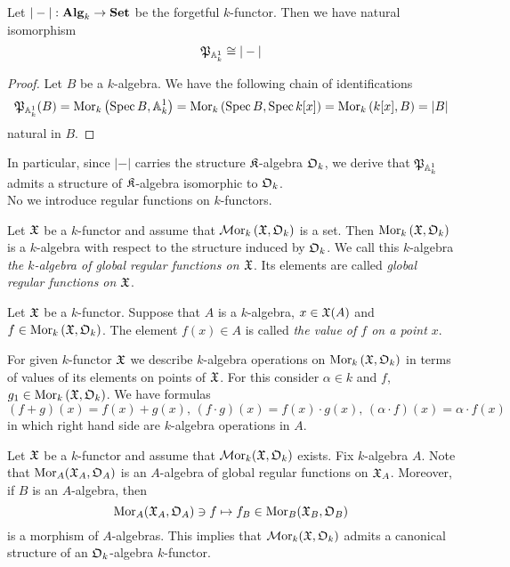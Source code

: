 \begin{fact}\label{fact:affineline_as_forgetfulfunctor}
Let $|-|:\mathbf{Alg}_k\rightarrow \mathbf{Set}$ be the forgetful $k$-functor. Then we have natural isomorphism
$${\mathfrak P}_{\mathbb{A}^1_k} \cong |-|$$
\end{fact}
\begin{proof}
Let $B$ be a $k$-algebra. We have the following chain of identifications
$${\mathfrak P}_{\mathbb{A}^1_k}(B) = \mathrm{Mor}_k\left(\mathrm{Spec}\, B, \mathbb{A}^1_k\right) = \mathrm{Mor}_k\left(\mathrm{Spec}\, B, \mathrm{Spec}\, k[x]\right) = \mathrm{Mor}_k\left(k[x], B\right) = |B|$$
natural in $B$.
\end{proof}
\noindent
In particular, since $|-|$ carries the structure ${\mathfrak K}$-algebra ${\mathfrak O}_k$, we derive that ${\mathfrak P}_{\mathbb{A}^1_k}$ admits a structure of ${\mathfrak K}$-algebra isomorphic to ${\mathfrak O}_k$.\\
No we introduce regular functions on $k$-functors.

\begin{definition}
Let ${\mathfrak X}$ be a $k$-functor and assume that $\mathcal{M}\mathrm{or}_k\left({\mathfrak X}, {\mathfrak O}_k\right)$ is a set. Then $\mathrm{Mor}_k\left({\mathfrak X}, {\mathfrak O}_k\right)$ is a $k$-algebra with respect to the structure induced by ${\mathfrak O}_k$. We call this $k$-algebra \textit{the $k$-algebra of global regular functions on ${\mathfrak X}$}. Its elements are called \textit{global regular functions on ${\mathfrak X}$}.
\end{definition}

\begin{definition}
Let ${\mathfrak X}$ be a $k$-functor. Suppose that $A$ is a $k$-algebra, $x\in {\mathfrak X}(A)$ and $f\in \mathrm{Mor}_k\left({\mathfrak X},{\mathfrak O}_k\right)$. The element $f(x) \in A$ is called \textit{the value of $f$ on a point $x$}.
\end{definition}
\noindent
For given $k$-functor ${\mathfrak X}$ we describe $k$-algebra operations on $\mathrm{Mor}_k\left({\mathfrak X},{\mathfrak O}_k\right)$ in terms of values of its elements on points of ${\mathfrak X}$. For this consider $\alpha \in k$ and $f$, $g_1\in \mathrm{Mor}_k\left({\mathfrak X}, {\mathfrak O}_k\right)$. We have formulas
$$\left(f+g\right)(x) = f(x)+g(x),\,\left(f\cdot g\right)(x) = f(x)\cdot g(x),\,\left(\alpha \cdot f\right)(x) = \alpha \cdot f(x)$$
in which right hand side are $k$-algebra operations in $A$.

\begin{example}\label{example:regular_functions_as_an_algebra_over_structure_algebra}
Let ${\mathfrak X}$ be a $k$-functor and assume that $\mathcal{M}\mathrm{or}_k({\mathfrak X},{\mathfrak O}_k)$ exists. Fix $k$-algebra $A$. Note that $\mathrm{Mor}_A({\mathfrak X}_A,{\mathfrak O}_A)$ is an $A$-algebra of global regular functions on ${\mathfrak X}_A$. Moreover, if $B$ is an $A$-algebra, then
$$\mathrm{Mor}_A({\mathfrak X}_A,{\mathfrak O}_A) \ni f \mapsto f_B\in \mathrm{Mor}_B({\mathfrak X}_B,{\mathfrak O}_B)$$
is a morphism of $A$-algebras. This implies that $\mathcal{M}\mathrm{or}_k({\mathfrak X},{\mathfrak O}_k)$ admits a canonical structure of an ${\mathfrak O}_k$-algebra $k$-functor.
\end{example}


